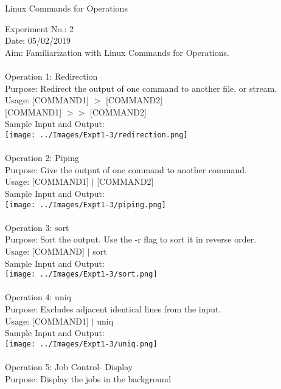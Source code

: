 \documentclass[10pt,a4paper]{report}
\begin{document}
\pagebreak

\begin{center}
\begin{Large}
Linux Commands for Operations
\end{Large}
\end{center}
Experiment No.: 2\\
Date: 05/02/2019\\
Aim: Familiarization with Linux Commands for Operations.\\
\\
Operation 1: Redirection\\
Purpose: Redirect the output of one command to another file, or stream.\\
Usage: [COMMAND1] $>$ [COMMAND2]\\
{[COMMAND1]} $>>$ [COMMAND2]\\
Sample Input and Output:\\
\texttt{[image: ../Images/Expt1-3/redirection.png]}\\
\\
Operation 2: Piping\\
Purpose: Give the output of one command to another command.\\
Usage: [COMMAND1] $|$ [COMMAND2]\\
Sample Input and Output:\\
\texttt{[image: ../Images/Expt1-3/piping.png]}\\
\pagebreak
\\
Operation 3: sort\\
Purpose: Sort the output. Use the -r flag to sort it in reverse order.\\
Usage: [COMMAND] $|$ sort\\
Sample Input and Output:\\
\texttt{[image: ../Images/Expt1-3/sort.png]}\\
\\
Operation 4: uniq\\
Purpose: Excludes adjacent identical lines from the input.\\
Usage: [COMMAND1] $|$ uniq\\
Sample Input and Output:\\
\texttt{[image: ../Images/Expt1-3/uniq.png]}\\
\pagebreak
\\
Operation 5: Job Control- Display\\
Purpose: Display the jobs in the background\\
\end{document}
